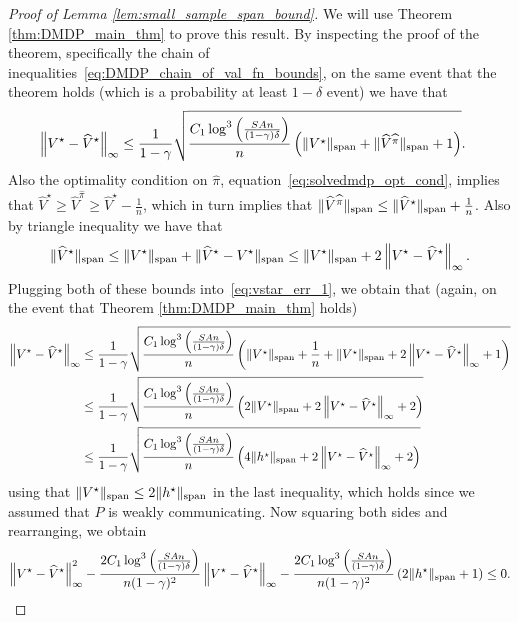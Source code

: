 \documentclass{article}
\theoremstyle{plain}
\theoremstyle{plain}
\theoremstyle{remark}
\theoremstyle{plain}
\theoremstyle{plain}
\newcommand{\Vhat}{\widehat{V}}
\newcommand{\pihat}{\widehat{\pi}}
\begin{document}
\begin{proof}[Proof of Lemma \ref{lem:small_sample_span_bound}]
    We will use Theorem \ref{thm:DMDP_main_thm} to prove this result. By inspecting the proof of the theorem, specifically the chain of inequalities~\eqref{eq:DMDP_chain_of_val_fn_bounds}, on the same event that the theorem holds (which is a probability at least $1-\delta$ event) we have that
    \begin{align}
        \infnorm{V^\star - \Vhat^\star} &\leq  \frac{1 }{1-\gamma}\sqrt{\frac{C_1  \log^3 \left( \frac{SAn}{(1-\gamma) \delta}\right) }{n}\left( \spannorm{V^{\star}} + \spannorm{\Vhat^{\pihat}} + 1\right) }. \label{eq:vstar_err_1}
    \end{align}
    Also the optimality condition on $\pihat$, equation~\eqref{eq:solvedmdp_opt_cond}, implies that $\Vhat^\star \geq \Vhat^{\pihat} \geq \Vhat^\star - \frac{1}{n}$, which in turn implies that $\spannorm{\Vhat^{\pihat}} \leq \spannorm{\Vhat^\star} + \frac{1}{n}$. Also by triangle inequality we have that
    \[
         \spannorm{\Vhat^\star} \leq \spannorm{V^\star} + \spannorm{\Vhat^\star - V^\star} \leq \spannorm{V^\star} + 2 \infnorm{V^\star - \Vhat^\star}.
    \]
    Plugging both of these bounds into~\eqref{eq:vstar_err_1}, we obtain that (again, on the event that Theorem \ref{thm:DMDP_main_thm} holds)
    \begin{align}
        \infnorm{V^\star - \Vhat^\star}  &\leq  \frac{1 }{1-\gamma}\sqrt{\frac{C_1  \log^3 \left( \frac{SAn}{(1-\gamma) \delta}\right) }{n}\left( \spannorm{V^{\star}} + \frac{1}{n} + \spannorm{V^\star} + 2 \infnorm{V^\star - \Vhat^\star} + 1\right) } \nonumber \\
        & \leq \frac{1 }{1-\gamma}\sqrt{\frac{C_1  \log^3 \left( \frac{SAn}{(1-\gamma) \delta}\right) }{n}\left( 2\spannorm{V^{\star}} + 2 \infnorm{V^\star - \Vhat^\star} + 2\right) } \nonumber \\
        & \leq \frac{1 }{1-\gamma}\sqrt{\frac{C_1  \log^3 \left( \frac{SAn}{(1-\gamma) \delta}\right) }{n}\left( 4\spannorm{h^{\star}} + 2 \infnorm{V^\star - \Vhat^\star} + 2\right) } \label{eq:vstar_err_2}
    \end{align}
    using that $\Vert V^\star\Vert _{\textnormal{span}} \leq 2 \Vert h^\star\Vert _{\textnormal{span}}$ \citep[Lemma 2]{wei_model-free_2020} in the last inequality, which holds since we assumed that $P$ is weakly communicating. Now squaring both sides and rearranging, we obtain
    \begin{align*}
        \infnorm{V^\star - \Vhat^\star}^2 - \frac{2C_1  \log^3 \left( \frac{SAn}{(1-\gamma) \delta}\right)}{n(1-\gamma)^2} \infnorm{V^\star - \Vhat^\star} - \frac{2C_1  \log^3 \left( \frac{SAn}{(1-\gamma) \delta}\right)}{n(1-\gamma)^2} \left(2\spannorm{h^{\star}} +1 \right) \leq 0.

\end{align*}
\end{proof}
\end{document}
